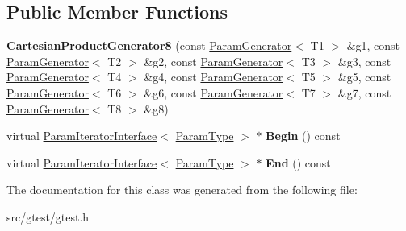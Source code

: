 \subsection*{Public Member Functions}
\begin{DoxyCompactItemize}
\item 
\mbox{\label{classtesting_1_1internal_1_1_cartesian_product_generator8_a07f33a7263f933d4fbabdb9e930d7f86}} 
{\bfseries Cartesian\+Product\+Generator8} (const \mbox{\hyperlink{classtesting_1_1internal_1_1_param_generator}{Param\+Generator}}$<$ T1 $>$ \&g1, const \mbox{\hyperlink{classtesting_1_1internal_1_1_param_generator}{Param\+Generator}}$<$ T2 $>$ \&g2, const \mbox{\hyperlink{classtesting_1_1internal_1_1_param_generator}{Param\+Generator}}$<$ T3 $>$ \&g3, const \mbox{\hyperlink{classtesting_1_1internal_1_1_param_generator}{Param\+Generator}}$<$ T4 $>$ \&g4, const \mbox{\hyperlink{classtesting_1_1internal_1_1_param_generator}{Param\+Generator}}$<$ T5 $>$ \&g5, const \mbox{\hyperlink{classtesting_1_1internal_1_1_param_generator}{Param\+Generator}}$<$ T6 $>$ \&g6, const \mbox{\hyperlink{classtesting_1_1internal_1_1_param_generator}{Param\+Generator}}$<$ T7 $>$ \&g7, const \mbox{\hyperlink{classtesting_1_1internal_1_1_param_generator}{Param\+Generator}}$<$ T8 $>$ \&g8)
\item 
\mbox{\label{classtesting_1_1internal_1_1_cartesian_product_generator8_a7a8d51311f6fda872c66a9a921fd0ae6}} 
virtual \mbox{\hyperlink{classtesting_1_1internal_1_1_param_iterator_interface}{Param\+Iterator\+Interface}}$<$ \mbox{\hyperlink{classstd_1_1tr1_1_1tuple}{Param\+Type}} $>$ $\ast$ {\bfseries Begin} () const
\item 
\mbox{\label{classtesting_1_1internal_1_1_cartesian_product_generator8_a397d020313918686b0b8cf5963526472}} 
virtual \mbox{\hyperlink{classtesting_1_1internal_1_1_param_iterator_interface}{Param\+Iterator\+Interface}}$<$ \mbox{\hyperlink{classstd_1_1tr1_1_1tuple}{Param\+Type}} $>$ $\ast$ {\bfseries End} () const
\end{DoxyCompactItemize}


The documentation for this class was generated from the following file\+:\begin{DoxyCompactItemize}
\item 
src/gtest/gtest.\+h\end{DoxyCompactItemize}
